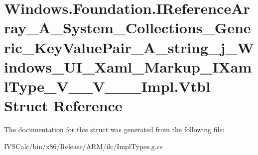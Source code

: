 \hypertarget{struct_windows_1_1_foundation_1_1_i_reference_array___a___system___collections___generic___key_v92868ad8c9c3829dfbb1c1d0279944a2}{}\section{Windows.\+Foundation.\+I\+Reference\+Array\+\_\+\+A\+\_\+\+System\+\_\+\+Collections\+\_\+\+Generic\+\_\+\+Key\+Value\+Pair\+\_\+\+A\+\_\+string\+\_\+j\+\_\+\+Windows\+\_\+\+U\+I\+\_\+\+Xaml\+\_\+\+Markup\+\_\+\+I\+Xaml\+Type\+\_\+\+V\+\_\+\+\_\+\+V\+\_\+\+\_\+\+\_\+\+Impl.\+Vtbl Struct Reference}
\label{struct_windows_1_1_foundation_1_1_i_reference_array___a___system___collections___generic___key_v92868ad8c9c3829dfbb1c1d0279944a2}


The documentation for this struct was generated from the following file\+:\begin{DoxyCompactItemize}
\item 
I\+V\+S\+Calc/bin/x86/\+Release/\+A\+R\+M/ilc/Impl\+Types.\+g.\+cs\end{DoxyCompactItemize}
